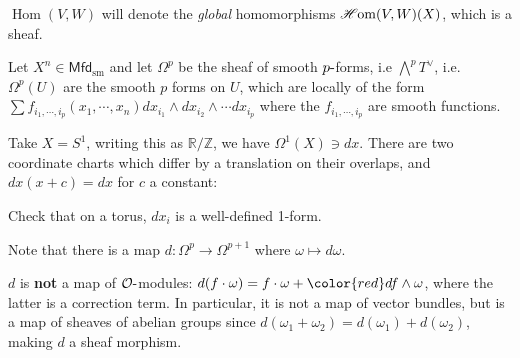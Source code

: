 \begin{warnings}

\({\operatorname{Hom}}(V, W)\) will denote the \emph{global}
homomorphisms \(\mathscr{H}\kern-2pt\operatorname{om}(V, W)(X)\), which
is a sheaf.

\end{warnings}

\begin{example}[?]

Let \(X^n \in {\mathsf{Mfd}}_{{\operatorname{sm}}}\) and let
\(\Omega^p\) be the sheaf of smooth \(p{\hbox{-}}\)forms, i.e
\(\bigwedge^p T^\vee\), i.e.~\(\Omega^p(U)\) are the smooth \(p\) forms
on \(U\), which are locally of the form
\(\sum f_{i_1, \cdots, i_p} (x_1, \cdots, x_n) dx_{i_1} \wedge dx_{i_2} \wedge \cdots dx_{i_p}\)
where the \(f_{i_1, \cdots, i_p}\) are smooth functions.

\begin{example}

Take \(X= S^1\), writing this as \({\mathbb{R}}/{\mathbb{Z}}\), we have
\(\Omega^1(X) \ni dx\). There are two coordinate charts which differ by
a translation on their overlaps, and \(dx(x + c) =dx\) for \(c\) a
constant:

\begin{figure}
\centering
{}
\end{figure}

\end{example}

\begin{exercise}[?]

Check that on a torus, \(dx_i\) is a well-defined 1-form.

\end{exercise}

\end{example}

\begin{remark}

Note that there is a map \(d: \Omega^p \to \Omega^{p+1}\) where
\(\omega\mapsto d \omega\).

\end{remark}

\begin{warnings}

\(d\) is \textbf{not} a map of \({\mathcal{O}}{\hbox{-}}\)modules:
\(d(f\cdot \omega) = f\cdot \omega + {\color{red} df \wedge \omega}\),
where the latter is a correction term. In particular, it is not a map of
vector bundles, but is a map of sheaves of abelian groups since
\(d ( \omega_1 + \omega_2) = d( \omega_1 ) + d ( \omega_2)\), making
\(d\) a sheaf morphism.

\end{warnings}


